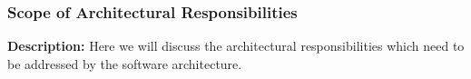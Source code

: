 
\subsubsection{Scope of Architectural Responsibilities}
\begin{flushleft}
	\textbf{Description: }
	Here we will discuss the architectural responsibilities which need to be addressed by the software architecture.
\end{flushleft}